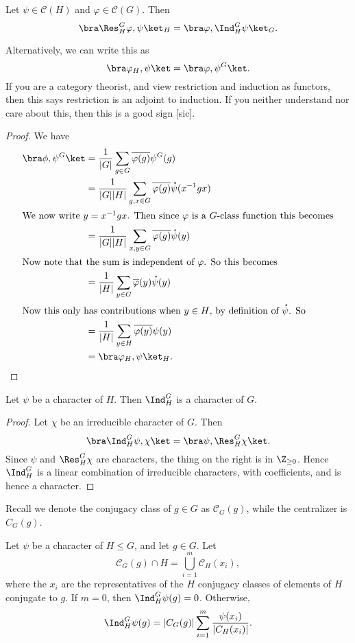 \documentclass[a4paper]{article}
\begin{document}
\begin{thm}
  Let $\psi \in \mathcal{C}(H)$ and $\varphi \in \mathcal{C}(G)$. Then
  \[
    \bra \Res_H^G \varphi, \psi\ket_H = \bra \varphi, \Ind_H^G \psi\ket_G.
  \]
\end{thm}
Alternatively, we can write this as
\[
  \bra \varphi_H, \psi\ket = \bra \varphi, \psi^G\ket.
\]
If you are a category theorist, and view restriction and induction as functors, then this says restriction is an adjoint to induction. If you neither understand nor care about this, then this is a good sign [sic].

\begin{proof}
  We have
  \begin{align*}
    \bra \phi, \psi^G\ket &= \frac{1}{|G|} \sum_{g \in G} \overline{\varphi(g)}\psi^G(g) \\
    &= \frac{1}{|G||H|} \sum_{g, x \in G} \overline{\varphi(g)} \mathring{\psi}(x^{-1}gx)\\
    \intertext{We now write $y = x^{-1} gx$. Then since $\varphi$ is a $G$-class function this becomes}
    &= \frac{1}{|G||H|} \sum_{x, y \in G} \overline{\varphi(g)} \mathring{\psi}(y)\\
    \intertext{Now note that the sum is independent of $\varphi$. So this becomes}
    &=\frac{1}{|H|} \sum_{y \in G} \overline{\varphi}(y) \mathring{\psi}(y)\\
    \intertext{Now this only has contributions when $y \in H$, by definition of $\mathring{\psi}$. So}
    &= \frac{1}{|H|} \sum_{y \in H} \overline{\varphi(y)}\psi(y)\\
    &= \bra \varphi_H, \psi\ket_H.
  \end{align*}
\end{proof}

\begin{cor}
  Let $\psi$ be a character of $H$. Then $\Ind_H^G$ is a character of $G$.
\end{cor}

\begin{proof}
  Let $\chi$ be an irreducible character of $G$. Then
  \[
    \bra \Ind_H^G \psi, \chi\ket = \bra \psi, \Res_H^G \chi\ket.
  \]
  Since $\psi$ and $\Res_H^G \chi$ are characters, the thing on the right is in $\Z_{\geq 0}$. Hence $\Ind_H^G$ is a linear combination of irreducible characters, with coefficients, and is hence a character.
\end{proof}

Recall we denote the conjugacy class of $g \in G$ as $\mathcal{C}_G(g)$, while the centralizer is $C_G(g)$.
\begin{prop}
  Let $\psi$ be a character of $H \leq G$, and let $g \in G$. Let
  \[
    \mathcal{C}_G(g) \cap H = \bigcup_{i = 1}^m \mathcal{C}_H(x_i),
  \]
  where the $x_i$ are the representatives of the $H$ conjugacy classes of elements of $H$ conjugate to $g$. If $m = 0$, then $\Ind_H^G\psi(g) = 0$. Otherwise,
  \[
    \Ind_H^G \psi(g) = |C_G(g)| \sum_{i = 1}^m \frac{\psi(x_i)}{|C_H(x_i)|}.
  \]
\end{prop}
\end{document}
